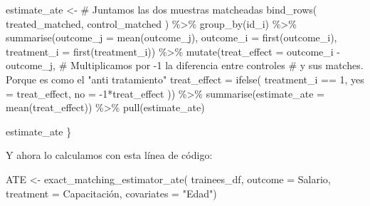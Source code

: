 \documentclass[
  letterpaper,
  DIV=11,
  numbers=noendperiod,
  oneside]{scrreprt}
\newenvironment{Shaded}{\begin{snugshade}}{\end{snugshade}}
\newcommand{\AttributeTok}[1]{\textcolor[rgb]{0.40,0.45,0.13}{#1}}
\newcommand{\CommentTok}[1]{\textcolor[rgb]{0.37,0.37,0.37}{#1}}
\newcommand{\DecValTok}[1]{\textcolor[rgb]{0.68,0.00,0.00}{#1}}
\newcommand{\FunctionTok}[1]{\textcolor[rgb]{0.28,0.35,0.67}{#1}}
\newcommand{\NormalTok}[1]{\textcolor[rgb]{0.00,0.23,0.31}{#1}}
\newcommand{\OtherTok}[1]{\textcolor[rgb]{0.00,0.23,0.31}{#1}}
\newcommand{\SpecialCharTok}[1]{\textcolor[rgb]{0.37,0.37,0.37}{#1}}
\newcommand{\StringTok}[1]{\textcolor[rgb]{0.13,0.47,0.30}{#1}}
\begin{document}
\begin{Shaded}
\begin{Highlighting}[]
\NormalTok{  estimate\_ate }\OtherTok{\textless{}{-}} 
    \CommentTok{\# Juntamos las dos muestras matcheadas}
    \FunctionTok{bind\_rows}\NormalTok{(}
\NormalTok{      treated\_matched,}
\NormalTok{      control\_matched}
\NormalTok{    ) }\SpecialCharTok{\%\textgreater{}\%} 
    \FunctionTok{group\_by}\NormalTok{(id\_i) }\SpecialCharTok{\%\textgreater{}\%}
    \FunctionTok{summarise}\NormalTok{(}\AttributeTok{outcome\_j =} \FunctionTok{mean}\NormalTok{(outcome\_j),}
              \AttributeTok{outcome\_i =} \FunctionTok{first}\NormalTok{(outcome\_i),}
              \AttributeTok{treatment\_i =} \FunctionTok{first}\NormalTok{(treatment\_i)) }\SpecialCharTok{\%\textgreater{}\%}
    \FunctionTok{mutate}\NormalTok{(}\AttributeTok{treat\_effect =}\NormalTok{ outcome\_i }\SpecialCharTok{{-}}\NormalTok{ outcome\_j,}
           \CommentTok{\# Multiplicamos por {-}1 la diferencia entre controles}
           \CommentTok{\# y sus matches. Porque es como el "anti tratamiento"}
           \AttributeTok{treat\_effect =} \FunctionTok{ifelse}\NormalTok{(}
\NormalTok{             treatment\_i }\SpecialCharTok{==} \DecValTok{1}\NormalTok{,}
             \AttributeTok{yes =}\NormalTok{ treat\_effect,}
             \AttributeTok{no =} \SpecialCharTok{{-}}\DecValTok{1}\SpecialCharTok{*}\NormalTok{treat\_effect}
\NormalTok{           )) }\SpecialCharTok{\%\textgreater{}\%}
    \FunctionTok{summarise}\NormalTok{(}\AttributeTok{estimate\_ate =} \FunctionTok{mean}\NormalTok{(treat\_effect)) }\SpecialCharTok{\%\textgreater{}\%} 
    \FunctionTok{pull}\NormalTok{(estimate\_ate)}
  
\NormalTok{  estimate\_ate}
\NormalTok{\}}
\end{Highlighting}
\end{Shaded}

Y ahora lo calculamos con esta línea de código:

\begin{Shaded}
\begin{Highlighting}[]
\NormalTok{ATE }\OtherTok{\textless{}{-}} 
  \FunctionTok{exact\_matching\_estimator\_ate}\NormalTok{(}
\NormalTok{    trainees\_df,}
    \AttributeTok{outcome =}\NormalTok{ Salario,}
    \AttributeTok{treatment =}\NormalTok{ Capacitación,}
    \AttributeTok{covariates =} \StringTok{"Edad"}\NormalTok{)}
\end{Highlighting}
\end{Shaded}
\end{document}
